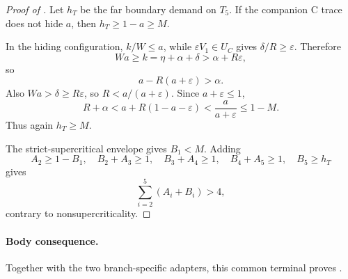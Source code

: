 \begin{proof}[Proof of ]
Let $h_T$ be the far boundary demand on $T_5$.  If the companion C trace
does not hide $a$, then $h_T\ge1-a\ge M$.

In the hiding configuration, $k/W\le a$, while
$\varepsilon V_1\in U_C$ gives $\delta/R\ge\varepsilon$.  Therefore
\[
 Wa\ge k=\eta+\alpha+\delta>\alpha+R\varepsilon,
\]
so
\[
 a-R(a+\varepsilon)>\alpha.
\]
Also $Wa>\delta\ge R\varepsilon$, so
$R<a/(a+\varepsilon)$.  Since $a+\varepsilon\le1$,
\[
 R+\alpha
 <a+R(1-a-\varepsilon)
 <\frac{a}{a+\varepsilon}
 \le1-M.
\]
Thus again $h_T\ge M$.

The strict-supercritical envelope gives $B_1<M$.  Adding
\[
 A_2\ge1-B_1,\quad
 B_2+A_3\ge1,\quad B_3+A_4\ge1,\quad B_4+A_5\ge1,
 \quad B_5\ge h_T
\]
gives
\[
 \sum_{i=2}^5(A_i+B_i)>4,
\]
contrary to nonsupercriticality.
\end{proof}

\paragraph{Body consequence.}
Together with the two branch-specific adapters, this common terminal proves
.
